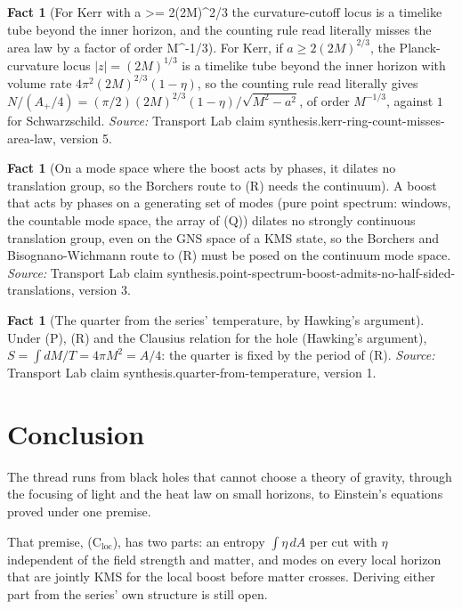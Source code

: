 \documentclass[11pt]{article}
\theoremstyle{definition}
\newtheorem{fact}[theorem]{Fact}
\theoremstyle{plain}
\begin{document}
\begin{fact}[For Kerr with a >= 2(2M)\^{}{2/3} the curvature-cutoff locus is a timelike tube beyond the inner horizon, and the counting rule read literally misses the area law by a factor of order M\^{}{-1/3}]\label{c:synthesis.kerr-ring-count-misses-area-law}
For Kerr, if $a \ge 2(2M)^{2/3}$, the Planck-curvature locus $|z| = (2M)^{1/3}$ is a timelike tube beyond the inner horizon with volume rate $4\pi^2(2M)^{2/3}(1 - \eta)$, so the counting rule read literally gives $N/(A_+/4) = (\pi/2)(2M)^{2/3}(1 - \eta)/\sqrt{M^2 - a^2}$, of order $M^{-1/3}$, against $1$ for Schwarzschild.
\emph{Source:} Transport Lab claim synthesis.kerr-ring-count-misses-area-law, version 5.
\end{fact}

\begin{fact}[On a mode space where the boost acts by phases, it dilates no translation group, so the Borchers route to (R) needs the continuum]\label{c:synthesis.point-spectrum-boost-admits-no-half-sided-translations}
A boost that acts by phases on a generating set of modes (pure point spectrum: windows, the countable mode space, the array of (Q)) dilates no strongly continuous translation group, even on the GNS space of a KMS state, so the Borchers and Bisognano-Wichmann route to (R) must be posed on the continuum mode space.
\emph{Source:} Transport Lab claim synthesis.point-spectrum-boost-admits-no-half-sided-translations, version 3.
\end{fact}

\begin{fact}[The quarter from the series' temperature, by Hawking's argument]\label{c:synthesis.quarter-from-temperature}
Under (P), (R) and the Clausius relation for the hole (Hawking's argument), $S = \int dM/T = 4\pi M^{2} = A/4$: the quarter is fixed by the period of (R).
\emph{Source:} Transport Lab claim synthesis.quarter-from-temperature, version 1.
\end{fact}

\section*{Conclusion}
The thread runs from black holes that cannot choose a theory of gravity, through the focusing of light and the heat law on small horizons, to Einstein's equations proved under one premise.

That premise, (C$_{\mathrm{loc}}$), has two parts: an entropy $\int\eta\,dA$ per cut with $\eta$ independent of the field strength and matter, and modes on every local horizon that are jointly KMS for the local boost before matter crosses. Deriving either part from the series' own structure is still open.
\end{document}

